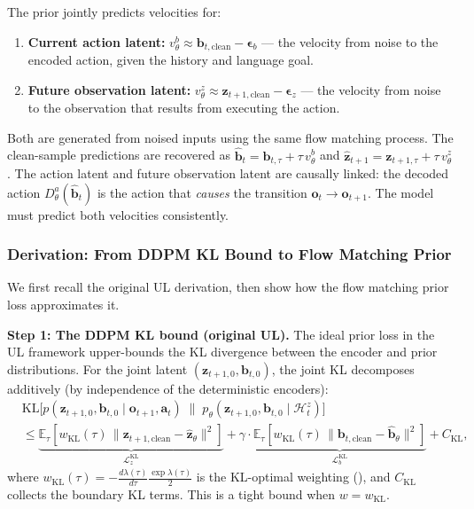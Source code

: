 \documentclass{article}
\newcommand{\vo}{\bm{o}}
\newcommand{\vz}{\bm{z}}
\newcommand{\va}{\bm{a}}
\newcommand{\vb}{\bm{b}}
\newcommand{\vep}{\bm{\epsilon}}
\newcommand{\E}{\mathbb{E}}
\newcommand{\KL}{\mathrm{KL}}
\newcommand{\loss}{\mathcal{L}}
\begin{document}
The prior jointly predicts velocities for:
\begin{enumerate}[leftmargin=*,itemsep=2pt]
  \item \textbf{Current action latent:} $v_\theta^b \approx \vb_{t,\text{clean}} - \vep_b$ --- the velocity from noise to the encoded action, given the history and language goal.
  \item \textbf{Future observation latent:} $v_\theta^z \approx \vz_{t+1,\text{clean}} - \vep_z$ --- the velocity from noise to the observation that results from executing the action.
\end{enumerate}
Both are generated from noised inputs using the same flow matching process. The clean-sample predictions are recovered as $\hat{\vb}_t = \vb_{t,\tau} + \tau\, v_\theta^b$ and $\hat{\vz}_{t+1} = \vz_{t+1,\tau} + \tau\, v_\theta^z$. The action latent and future observation latent are causally linked: the decoded action $D_\theta^a(\hat{\vb}_t)$ is the action that \emph{causes} the transition $\vo_t \to \vo_{t+1}$. The model must predict both velocities consistently.

\subsubsection{Derivation: From DDPM KL Bound to Flow Matching Prior}
\label{sec:fm_derivation}

We first recall the original UL derivation, then show how the flow matching prior loss approximates it.

\textbf{Step 1: The DDPM KL bound (original UL).}
The ideal prior loss in the UL framework upper-bounds the KL divergence between the encoder and prior distributions. For the joint latent $(\vz_{t+1,0}, \vb_{t,0})$, the joint KL decomposes additively (by independence of the deterministic encoders):
\begin{align}
  &\KL\!\Big[p(\vz_{t+1,0}, \vb_{t,0} \mid \vo_{t+1}, \va_t) \;\Big\|\; p_\theta(\vz_{t+1,0}, \vb_{t,0} \mid \mathcal{H}_t^z)\Big] \nonumber \\
  &\leq \underbrace{\E_\tau\!\left[w_{\KL}(\tau)\,\|\vz_{t+1,\text{clean}} - \hat{\vz}_\theta\|^2\right]}_{\loss_z^{\text{KL}}} + \gamma \cdot \underbrace{\E_\tau\!\left[w_{\KL}(\tau)\,\|\vb_{t,\text{clean}} - \hat{\vb}_\theta\|^2\right]}_{\loss_b^{\text{KL}}} + C_{\KL},
  \label{eq:ddpm_kl_bound}
\end{align}
where $w_{\KL}(\tau) = -\frac{d\lambda(\tau)}{d\tau}\frac{\exp\lambda(\tau)}{2}$ is the KL-optimal weighting (), and $C_{\KL}$ collects the boundary KL terms. This is a tight bound when $w = w_{\KL}$.
\end{document}
